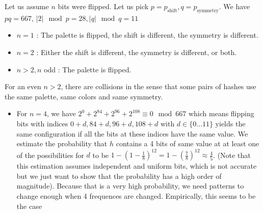\documentclass{article}
\begin{document}
Let us assume $n$ bits were flipped. Let us pick $p=p_{\text{shift}}, q=p_{\text{symmetry}}$. We have $pq = 667$, $|2| \mod p = 28, |q| \mod q = 11$
\begin{itemize}
	\item $n=1$ : The palette is flipped, the shift is different, the symmetry is different.
	\item $n=2$ : Either the shift is different, the symmetry is different, or both.
	\item $n > 2, n$ odd : The palette is flipped.
\end{itemize}
For an even $n > 2$, there are collisions in the sense that some pairs of hashes use the same palette, same colors and same symmetry.
\begin{itemize}
	\item For $n = 4$, we have $2^0 + 2^{84} + 2^{96} + 2^{108} \equiv 0 \mod 667$ which means flipping bits with indices $0 + d, 84 + d, 96 + d, 108 + d$ with $d \in \{0 \dots 11\}$ yields the same configuration if all the bits at these indices have the same value. We estimate the probability that $h$ contains a 4 bits of same value at at least one of the possibilities for $d$ to be $1 - \left(1 - \frac{1}{8}\right)^{12} = 1 - \left(\frac{7}{8}\right)^{12} \approx \frac{4}{5}$. (Note that this estimation assumes independent and uniform bits, which is not accurate but we just want to show that the probability has a high order of magnitude). Because that is a very high probability, we need patterns to change enough when 4 frequences are changed. Empirically, this seems to be the case
\end{itemize}
\end{document}
